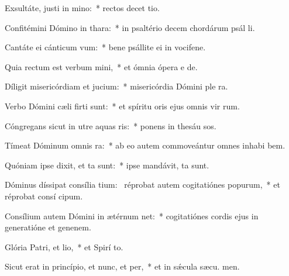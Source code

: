 \item Exsultáte, justi in mino:~* rectos decet tio.
\item Confitémini Dómino in thara:~* in psaltério decem chordárum psál li.
\item Cantáte ei cánticum vum:~* bene psállite ei in vocifene.
\item Quia rectum est verbum mini,~* et ómnia ópera e  de.
\item Díligit misericórdiam et jucium:~* misericórdia Dómini ple  ra.
\item Verbo Dómini cæli firti sunt:~* et spíritu oris ejus omnis vir rum.
\item Cóngregans sicut in utre aquas ris:~* ponens in thesáu sos.
\item Tímeat Dóminum omnis ra:~* ab eo autem commoveántur omnes inhabi bem.
\item Quóniam ipse dixit, et ta sunt:~* ipse mandávit,  ta sunt.
\item Dóminus díssipat consília tium:~\pscross{} réprobat autem cogitatiónes popurum,~* et réprobat consí cipum.
\item Consílium autem Dómini in ætérnum net:~* cogitatiónes cordis ejus in generatióne et genenem.
\item Glória Patri, et lio,~* et Spirí to.
\item Sicut erat in princípio, et nunc, et per,~* et in sǽcula sæcu. men.
